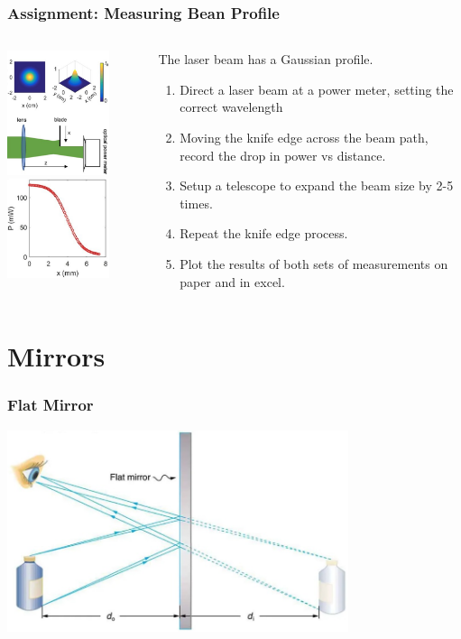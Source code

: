 \documentclass{beamer}
\begin{document}
\begin{frame}\frametitle{Assignment: Measuring Bean Profile}
\begin{columns}
\begin{column}{4cm}
\begin{center}
\includegraphics[width=3cm]{fig/profile1.jpg}
\includegraphics[width=3cm]{fig/profile2.jpg}
\end{center}
\end{column}
\begin{column}{7cm}
The laser beam has a Gaussian profile.
\begin{enumerate}
\item Direct a laser beam at a power meter, setting the correct wavelength
\item Moving the knife edge across the beam path, record the drop in power vs distance.
\item Setup a telescope to expand the beam size by 2-5 times.
\item Repeat the knife edge process.
\item Plot the results of both sets of measurements on paper and in excel.
\end{enumerate}
\end{column}
\end{columns}
\end{frame}

\section{Mirrors}

\begin{frame}\frametitle{Flat Mirror}

\begin{center}
\includegraphics[width=10cm]{fig/mirrorimage1.jpg}
\end{center}

\end{frame}
\end{document}
